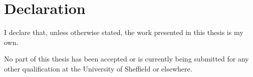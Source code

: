 \chapter*{Declaration}


\noindent I declare that, unless otherwise stated, the work presented in this thesis is my own.

\noindent No part of this thesis has been accepted or is currently being submitted for any other qualification at the University of Sheffield or elsewhere.
